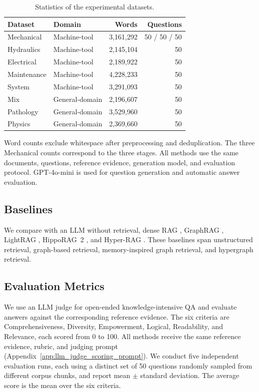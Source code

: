 \documentclass{article} %
\begin{document}
\begin{table}[H]
\centering
\caption{Statistics of the experimental datasets.}
\label{tab:dataset_statistics}
\small
\begin{tabular*}{\linewidth}{@{\extracolsep{\fill}}llrr@{}}
\toprule
Dataset & Domain & Words & Questions \\
\midrule
Mechanical & Machine-tool & 3,161,292 & 50 / 50 / 50 \\
Hydraulics & Machine-tool & 2,145,104 & 50 \\
Electrical & Machine-tool & 2,189,922 & 50 \\
Maintenance & Machine-tool & 4,228,233 & 50 \\
System & Machine-tool & 3,291,093 & 50 \\
Mix & General-domain & 2,196,607 & 50 \\
Pathology & General-domain & 3,529,960 & 50 \\
Physics & General-domain & 2,369,660 & 50 \\
\bottomrule
\end{tabular*}
\end{table}

Word counts exclude whitespace after preprocessing and deduplication. The three Mechanical counts correspond to the three stages. All methods use the same documents, questions, reference evidence, generation model, and evaluation protocol. GPT-4o-mini is used for question generation and automatic answer evaluation.

\subsection{Baselines}

We compare with an LLM without retrieval, dense RAG \citep{Karpukhin2020DPR}, GraphRAG \citep{Edge2025GraphRAG}, LightRAG \citep{Guo2025LightRAG}, HippoRAG~2 \citep{Gutierrez2025HippoRAG2}, and Hyper-RAG \citep{Feng2026HyperRAG}. These baselines span unstructured retrieval, graph-based retrieval, memory-inspired graph retrieval, and hypergraph retrieval.

\subsection{Evaluation Metrics}

We use an LLM judge for open-ended knowledge-intensive QA \citep{Liu2023GEval} and evaluate answers against the corresponding reference evidence. The six criteria are Comprehensiveness, Diversity, Empowerment, Logical, Readability, and Relevance, each scored from 0 to 100. All methods receive the same reference evidence, rubric, and judging prompt (Appendix~\ref{app:llm_judge_scoring_prompt}). We conduct five independent evaluation runs, each using a distinct set of 50 questions randomly sampled from different corpus chunks, and report mean $\pm$ standard deviation. The average score is the mean over the six criteria.
\end{document}
